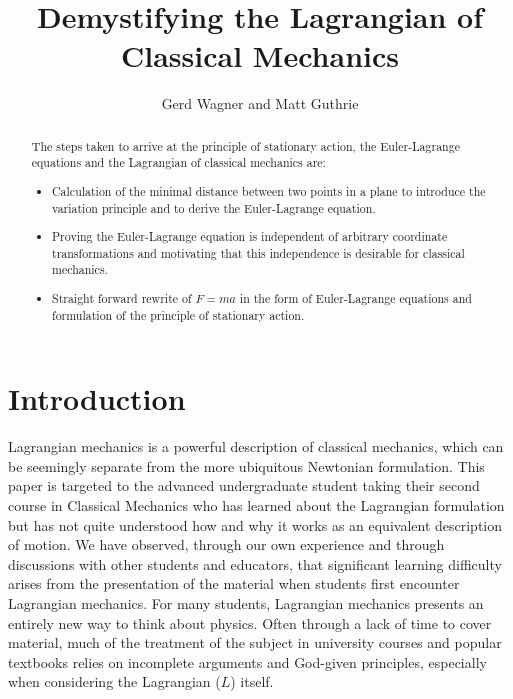 \documentclass{article}
\begin{document}
\title{Demystifying the Lagrangian of Classical Mechanics} %
\author{Gerd Wagner and Matt Guthrie}

\maketitle

\begin{abstract} %
The steps taken to arrive at the principle of stationary action, the Euler-Lagrange equations and the Lagrangian of classical mechanics are:
\begin{itemize}
\item Calculation of the minimal distance between two points in a plane to introduce the variation principle and to derive the Euler-Lagrange equation.
\item Proving the Euler-Lagrange equation is independent of arbitrary coordinate transformations and motivating that this independence is desirable for classical mechanics.
\item Straight forward rewrite of $F=ma$ in the form of Euler-Lagrange equations and formulation of the principle of stationary action.
\end{itemize}
\end{abstract}


\section{Introduction}

Lagrangian mechanics is a powerful description of classical mechanics, which can be seemingly separate from the more ubiquitous Newtonian formulation. This paper is targeted to the advanced undergraduate student taking their second course in Classical Mechanics who has learned about the Lagrangian formulation but has not quite understood how and why it works as an equivalent description of motion. We have observed, through our own experience and through discussions with other students and educators, that significant learning difficulty arises from the presentation of the material when students first encounter Lagrangian mechanics. For many students, Lagrangian mechanics presents an entirely new way to think about physics. Often through a lack of time to cover material, much of the treatment of the subject in university courses and popular textbooks relies on incomplete arguments and God-given principles, especially when considering the Lagrangian ($L$) itself.
\end{document}
